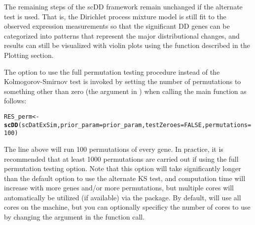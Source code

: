 \documentclass{article}\usepackage[]{graphicx}\usepackage[]{color}
\makeatletter
\newcommand{\hlnum}[1]{\textcolor[rgb]{0.686,0.059,0.569}{#1}}%
\newcommand{\hlstd}[1]{\textcolor[rgb]{0.345,0.345,0.345}{#1}}%
\newcommand{\hlkwb}[1]{\textcolor[rgb]{0.69,0.353,0.396}{#1}}%
\newcommand{\hlkwc}[1]{\textcolor[rgb]{0.333,0.667,0.333}{#1}}%
\newcommand{\hlkwd}[1]{\textcolor[rgb]{0.737,0.353,0.396}{\textbf{#1}}}%
\newenvironment{kframe}{%
 \def\at@end@of@kframe{}%
 \ifinner\ifhmode%
  \def\at@end@of@kframe{\end{minipage}}%
  \begin{minipage}{\columnwidth}%
 \fi\fi%
 \def\FrameCommand##1{\hskip\@totalleftmargin \hskip-\fboxsep
 \colorbox{shadecolor}{##1}\hskip-\fboxsep
     \hskip-\linewidth \hskip-\@totalleftmargin \hskip\columnwidth}%
 \MakeFramed {\advance\hsize-\width
   \@totalleftmargin\z@ \linewidth\hsize
   \@setminipage}}%
 {\par\unskip\endMakeFramed%
 \at@end@of@kframe}
\newenvironment{knitrout}{}{} %
\makeatother
\begin{document}
The remaining steps of the scDD framework remain unchanged if the alternate test is used.  That is, the Dirichlet process mixture model is still fit to the observed expression measurements so that the significant DD genes can be categorized into patterns that represent the major distributional changes, and results can still be visualized with violin plots using the  function described in the Plotting section.  

The option to use the full permutation testing procedure instead of the Kolmogorov-Smirnov test is invoked by setting the number of permutations to something other than zero (the  argument in ) when calling the main  function as follows:

\begin{knitrout}
\color{fgcolor}\begin{kframe}
\begin{alltt}
\hlstd{RES_perm} \hlkwb{<-} \hlkwd{scDD}\hlstd{(scDatExSim,} \hlkwc{prior_param}\hlstd{=prior_param,} \hlkwc{testZeroes}\hlstd{=}\hlnum{FALSE}\hlstd{,} \hlkwc{permutations}\hlstd{=}\hlnum{100}\hlstd{)}
\end{alltt}


{\ttfamily\noindent\itshape\color{messagecolor}{\#\# Clustering observed expression data for each gene}}

{\ttfamily\noindent\itshape\color{messagecolor}{\#\# Setting up parallel back-end using 4 cores}}

{\ttfamily\noindent\itshape\color{messagecolor}{\#\# Performing permutations to evaluate independence of clustering and condition for each gene}}

{\ttfamily\noindent\itshape\color{messagecolor}{\#\# Classifying significant genes into patterns}}\end{kframe}
\end{knitrout}

The line above will run 100 permutations of every gene.   In practice, it is recommended that at least 1000 permutations are carried out if using the full permutation testing option.  Note that this option will take significantly longer than the default option to use the alternate KS test, and computation time will increase with more genes and/or more permutations, but multiple cores will automatically be utilized (if available) via the  package.  By default,  will use all cores on the machine, but you can optionally specificy the number of cores to use by changing the  argument in the  function call.
\end{document}
